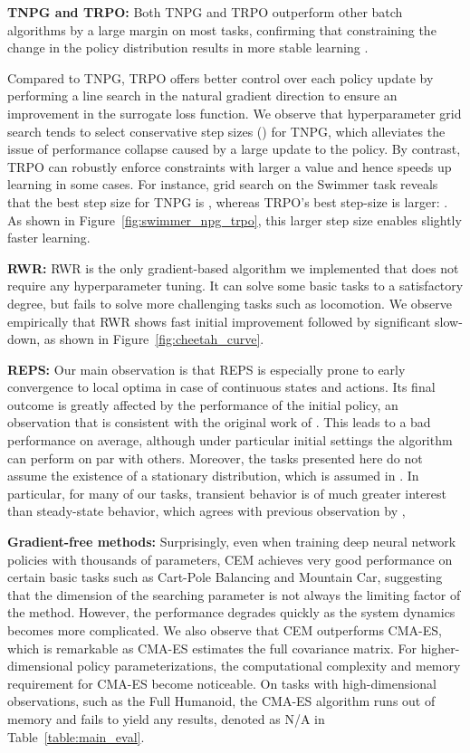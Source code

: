 \documentclass{article}
\begin{document}
{\bf TNPG and TRPO:} Both TNPG and TRPO outperform other batch algorithms by a large margin on most tasks, confirming that constraining the change in the policy distribution results in more stable learning \cite{peters2008reinforcement}.



Compared to TNPG, TRPO offers better control over each policy update by performing a line search in the natural gradient direction to ensure an improvement in the surrogate loss function. We observe that hyperparameter grid search tends to select conservative step sizes () for TNPG, which alleviates the issue of performance collapse caused by a large update to the policy. By contrast, TRPO can robustly enforce constraints with larger a  value and hence speeds up learning in some cases. For instance, grid search on the Swimmer task reveals that the best step size for TNPG is , whereas TRPO's best step-size is larger: . As shown in Figure~\ref{fig:swimmer_npg_trpo}, this larger step size enables slightly faster learning.







{\bf RWR:} RWR is the only gradient-based algorithm we implemented that does not require any hyperparameter tuning. It can solve some basic tasks to a satisfactory degree, but fails to solve more challenging tasks such as locomotion. We observe empirically that RWR shows fast initial improvement followed by significant slow-down, as shown in Figure~\ref{fig:cheetah_curve}.




{\bf REPS:} Our main observation is that REPS is especially prone to early convergence to local optima in case of continuous states and actions. Its final outcome is greatly affected by the performance of the initial policy, an observation that is consistent with the original work of \citet{Peters10REPS}. This leads to a bad performance on average, although under particular initial settings the algorithm can perform on par with others. Moreover, the tasks presented here do not assume the existence of a stationary distribution, which is assumed in \citet{Peters10REPS}. In particular, for many of our tasks, transient behavior is of much greater interest than steady-state behavior, which agrees with previous observation by \citet{HofNeuPet15}, 


{\bf Gradient-free methods:} Surprisingly, even when training deep neural network policies with thousands of parameters, CEM achieves very good performance on certain basic tasks such as Cart-Pole Balancing and Mountain Car, suggesting that the dimension of the searching parameter is not always the limiting factor of the method. However, the performance degrades quickly as the system dynamics becomes more complicated. We also observe that CEM outperforms CMA-ES, which is remarkable as CMA-ES estimates the full covariance matrix. For higher-dimensional policy parameterizations, the computational complexity and memory requirement for CMA-ES become noticeable. On tasks with high-dimensional observations, such as the Full Humanoid, the CMA-ES algorithm runs out of memory and fails to yield any results, denoted as N/A in Table~\ref{table:main_eval}.
\end{document}
